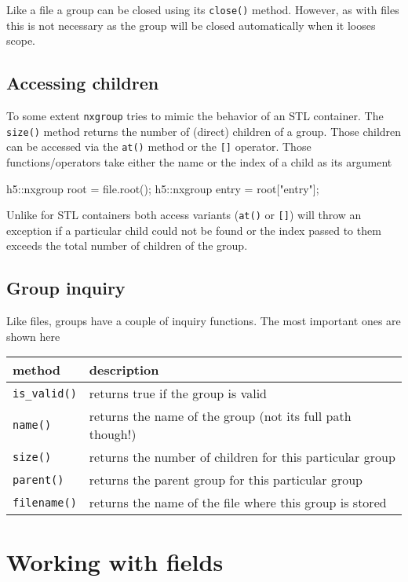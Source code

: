 Like a file a group can be closed using its {\tt close()} method. However, as
with files this is not necessary as the group will be closed automatically when
it looses scope.

\subsection{Accessing children}

To some extent {\tt nxgroup} tries to mimic the behavior of an STL container. 
The {\tt size()} method returns the number of (direct) children of a group. 
Those children can be accessed via the {\tt at()} method or the
{\tt []} operator. Those functions/operators take either the name or the index 
of a child as its argument
\begin{cppcode}
h5::nxgroup root = file.root();
h5::nxgroup entry = root["entry"];
\end{cppcode}
Unlike for STL containers both access variants ({\tt at()} or {\tt []}) will 
throw an exception if a particular child could not be found or the index passed
to them exceeds the total number of children of the group.

\subsection{Group inquiry}

Like files, groups have a couple of inquiry functions. The most important ones
are shown here
\begin{center}
\begin{tabular}{l|l}
method & description \\
\hline\hline
{\tt is\_valid()} & returns true if the group is valid \\
\hline
{\tt name()} & returns the name of the group (not its full path though!) \\
\hline
{\tt size()} & returns the number of children for this particular group \\
\hline
{\tt parent()} & returns the parent group for this particular group \\
\hline
{\tt filename()} & returns the name of the file where this group is stored \\
\hline
\end{tabular}
\end{center}



\section{Working with fields}

